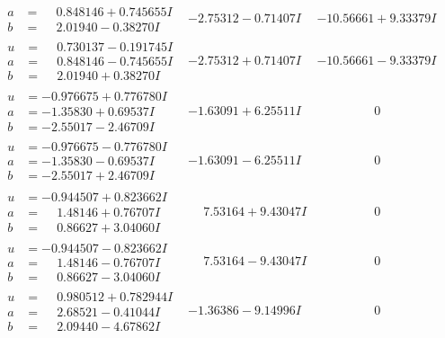 \documentclass[1p]{elsarticle_modified}
\theoremstyle{definition}
\begin{document}
$$\begin{array}{c|c|c}
\begin{aligned}
a &= \phantom{-}0.848146 + 0.745655 I \\
b &= \phantom{-}2.01940 - 0.38270 I\end{aligned}
 & -2.75312 - 0.71407 I & -10.56661 + 9.33379 I \\ \hline\begin{aligned}
u &= \phantom{-}0.730137 - 0.191745 I \\
a &= \phantom{-}0.848146 - 0.745655 I \\
b &= \phantom{-}2.01940 + 0.38270 I\end{aligned}
 & -2.75312 + 0.71407 I & -10.56661 - 9.33379 I \\ \hline\begin{aligned}
u &= -0.976675 + 0.776780 I \\
a &= -1.35830 + 0.69537 I \\
b &= -2.55017 - 2.46709 I\end{aligned}
 & -1.63091 + 6.25511 I & \phantom{-0.000000 } 0 \\ \hline\begin{aligned}
u &= -0.976675 - 0.776780 I \\
a &= -1.35830 - 0.69537 I \\
b &= -2.55017 + 2.46709 I\end{aligned}
 & -1.63091 - 6.25511 I & \phantom{-0.000000 } 0 \\ \hline\begin{aligned}
u &= -0.944507 + 0.823662 I \\
a &= \phantom{-}1.48146 + 0.76707 I \\
b &= \phantom{-}0.86627 + 3.04060 I\end{aligned}
 & \phantom{-}7.53164 + 9.43047 I & \phantom{-0.000000 } 0 \\ \hline\begin{aligned}
u &= -0.944507 - 0.823662 I \\
a &= \phantom{-}1.48146 - 0.76707 I \\
b &= \phantom{-}0.86627 - 3.04060 I\end{aligned}
 & \phantom{-}7.53164 - 9.43047 I & \phantom{-0.000000 } 0 \\ \hline\begin{aligned}
u &= \phantom{-}0.980512 + 0.782944 I \\
a &= \phantom{-}2.68521 - 0.41044 I \\
b &= \phantom{-}2.09440 - 4.67862 I\end{aligned}
 & -1.36386 - 9.14996 I & \phantom{-0.000000 } 0 \\ \hline\begin{aligned}

\end{aligned}
\end{array}$$
\end{document}
